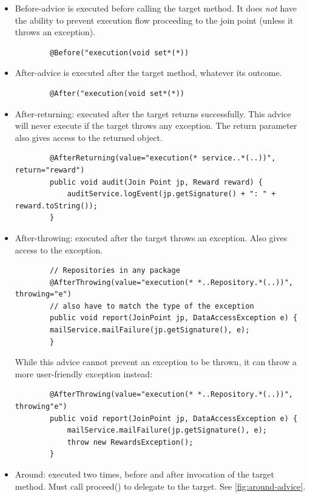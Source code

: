 \documentclass{scrartcl}
\begin{document}
\begin{itemize}
    \item Before-advice is executed before calling the target method. It does \textit{not} have the ability to prevent execution flow proceeding to the join point (unless it throws an exception).

    \begin{lstlisting}
        @Before("execution(void set*(*))    \end{lstlisting}
    \item
    After-advice is executed after the target method, whatever its outcome.
    \begin{lstlisting}
        @After("execution(void set*(*))
    \end{lstlisting}
    \item
    After-returning: executed after the target returns successfully. This advice will never execute if the target throws any exception.
    The return parameter also gives access to the returned object.
    \begin{lstlisting}
        @AfterReturning(value="execution(* service..*(..))", return="reward")
        public void audit(Join Point jp, Reward reward) {
            auditService.logEvent(jp.getSignature() + ": " + reward.toString());
        }
    \end{lstlisting}
    \item
    After-throwing: executed after the target throws an exception.
    Also gives access to the exception.
    \begin{lstlisting}
        // Repositories in any package
        @AfterThrowing(value="execution(* *..Repository.*(..))", throwing="e")
        // also have to match the type of the exception
        public void report(JoinPoint jp, DataAccessException e) {
        mailService.mailFailure(jp.getSignature(), e);
        }
    \end{lstlisting}
    While this advice cannot prevent an exception to be thrown, it can throw a more user-friendly exception instead:
    \begin{lstlisting}
        @AfterThrowing(value="execution(* *..Repository.*(..))", throwing"e")
        public void report(JoinPoint jp, DataAccessException e) {
            mailService.mailFailure(jp.getSignature(), e);
            throw new RewardsException();
        }
    \end{lstlisting}
    \item
    Around: executed two times, before and after invocation of the target method. Must call proceed() to delegate to the target. See \ref{fig:around-advice}.

\end{itemize}
\end{document}
